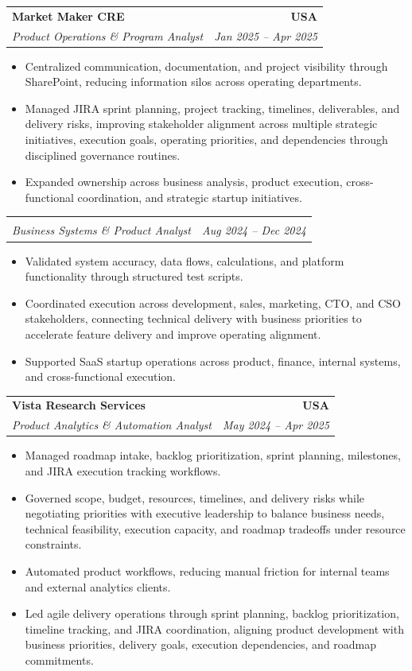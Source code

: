 \documentclass[letterpaper,10pt]{article}
\makeatletter
\newcommand{\resumeItem}[1]{\item \small{#1}}
\newcommand{\resumeSubheading}[4]{
  \vspace{1pt}\item
    \begin{tabular*}{1.0\textwidth}[t]{l@{\extracolsep{\fill}}r}
      \textbf{#1} & \textbf{\small #2} \\
      \textit{\small #3} & \textit{\small #4} \\
    \end{tabular*}\vspace{-6pt}
}
\newcommand{\resumeItemListStart}{\begin{itemize}[leftmargin=0.15in, itemsep=1pt, topsep=3pt]}
\newcommand{\resumeItemListEnd}{\end{itemize}\vspace{-2pt}}
\makeatother
\begin{document}
\vspace{-2pt}

\resumeSubheading
{Market Maker CRE}{USA}
{Product Operations \& Program Analyst}{Jan 2025 -- Apr 2025}
\resumeItemListStart
\resumeItem{Centralized communication, documentation, and project visibility through SharePoint, reducing information silos across operating departments.}
\resumeItem{Managed JIRA sprint planning, project tracking, timelines, deliverables, and delivery risks, improving stakeholder alignment across multiple strategic initiatives, execution goals, operating priorities, and dependencies through disciplined governance routines.}
\resumeItem{Expanded ownership across business analysis, product execution, cross-functional coordination, and strategic startup initiatives.}
\resumeItemListEnd

\vspace{-12pt}

\resumeSubheading
{}{}
{Business Systems \& Product Analyst}{Aug 2024 -- Dec 2024}
\resumeItemListStart
\resumeItem{Validated system accuracy, data flows, calculations, and platform functionality through structured test scripts.}
\resumeItem{Coordinated execution across development, sales, marketing, CTO, and CSO stakeholders, connecting technical delivery with business priorities to accelerate feature delivery and improve operating alignment.}
\resumeItem{Supported SaaS startup operations across product, finance, internal systems, and cross-functional execution.}
\resumeItemListEnd

\vspace{-2pt}

\resumeSubheading
{Vista Research Services}{USA}
{Product Analytics \& Automation Analyst}{May 2024 -- Apr 2025}
\resumeItemListStart
\resumeItem{Managed roadmap intake, backlog prioritization, sprint planning, milestones, and JIRA execution tracking workflows.}
\resumeItem{Governed scope, budget, resources, timelines, and delivery risks while negotiating priorities with executive leadership to balance business needs, technical feasibility, execution capacity, and roadmap tradeoffs under resource constraints.}
\resumeItem{Automated product workflows, reducing manual friction for internal teams and external analytics clients.}
\resumeItem{Led agile delivery operations through sprint planning, backlog prioritization, timeline tracking, and JIRA coordination, aligning product development with business priorities, delivery goals, execution dependencies, and roadmap commitments.}
\resumeItemListEnd
\end{document}
